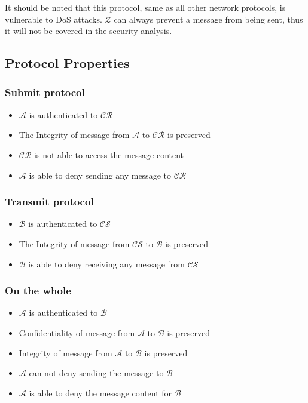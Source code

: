 \documentclass[10pt,a4paper]{article}
\begin{document}
It should be noted that this protocol, same as all other network protocols, is vulnerable to DoS attacks. $\mathcal{Z}$ can always prevent a message from being sent, thus it will not be covered in the security analysis.

\subsection*{Protocol Properties}
\subsubsection*{Submit protocol}
\begin{itemize}
\item $\mathcal{A}$ is authenticated to $\mathcal{CR}$
\item The Integrity of message from $\mathcal{A}$ to $\mathcal{CR}$ is preserved
\item $\mathcal{CR}$ is not able to access the message content
\item $\mathcal{A}$ is able to deny sending any message to $\mathcal{CR}$
\end{itemize}

\subsubsection*{Transmit protocol}
\begin{itemize}
\item $\mathcal{B}$ is authenticated to $\mathcal{CS}$
\item The Integrity of message from $\mathcal{CS}$ to $\mathcal{B}$ is preserved
\item $\mathcal{B}$ is able to deny receiving any message from $\mathcal{CS}$
\end{itemize}

\subsubsection*{On the whole}
\begin{itemize}
\item $\mathcal{A}$ is authenticated to $\mathcal{B}$
\item Confidentiality of message from $\mathcal{A}$ to $\mathcal{B}$ is preserved
\item Integrity of message from $\mathcal{A}$ to $\mathcal{B}$ is preserved
\item $\mathcal{A}$ can not deny sending the message to $\mathcal{B}$
\item $\mathcal{A}$ is able to deny the message content for $\mathcal{B}$
\end{itemize}
\end{document}

